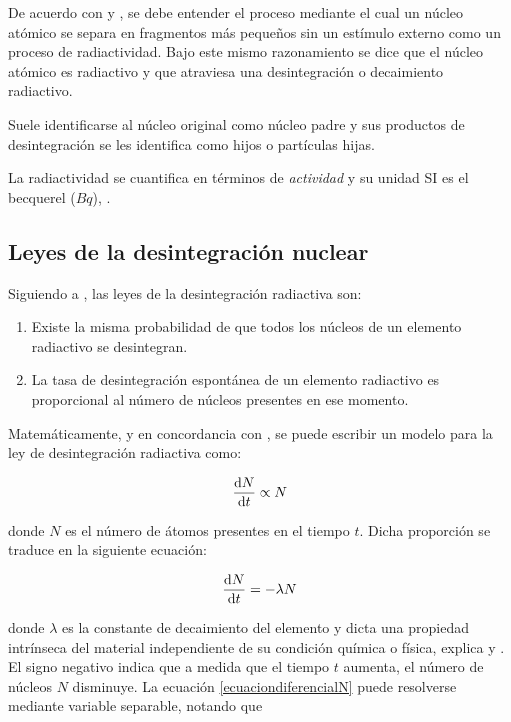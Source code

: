 De acuerdo con \cite{Sanctis.2016} y \cite{Podgorsak.2016}, se debe entender el proceso mediante el cual un núcleo atómico se separa en fragmentos más pequeños sin un estímulo externo como un proceso de radiactividad. Bajo este mismo razonamiento se dice que el núcleo atómico es radiactivo y que atraviesa una desintegración o decaimiento radiactivo. 

Suele identificarse al núcleo original como núcleo padre \cite{Sanctis.2016, Podgorsak.2016} y sus productos de desintegración se les identifica como hijos o partículas hijas\cite{Podgorsak.2016, Sanctis.2016}. 

La radiactividad se cuantifica en términos de \textit{actividad} y su unidad SI es el becquerel ($\unit{Bq}$), \cite{Podgorsak.2016}. 
\subsection{Leyes de la desintegración nuclear}

\noindent Siguiendo a \cite{Krane.1987}, las leyes de la desintegración radiactiva son: 
\begin{enumerate}
	\item Existe la misma probabilidad de que todos los núcleos de un elemento radiactivo se desintegran. 
	
	\item La tasa de desintegración espontánea de un elemento radiactivo es proporcional al número de núcleos presentes en ese momento.
	
\end{enumerate}

\noindent Matemáticamente, y en concordancia con \cite{Podgorsak.2016}, se puede escribir un modelo para la ley de desintegración radiactiva como: 

\begin{equation*}
\dv{N}{t} \propto N
\end{equation*}

\noindent donde $N$ es el número de átomos presentes en el tiempo $t$. Dicha proporción se traduce en la siguiente ecuación: 

\begin{equation}
\dv{N}{t} = -\lambda N\label{ecuaciondiferencialN}
\end{equation} 

\noindent donde $\lambda $ es la constante de decaimiento del elemento y dicta una propiedad intrínseca del material independiente de su condición química o física, explica \cite{Sanctis.2016} y \cite{Podgorsak.2016}. El signo negativo indica que a medida que el tiempo $t$ aumenta, el número de núcleos $N$ disminuye. La ecuación \ref{ecuaciondiferencialN} puede resolverse mediante variable separable, notando que

